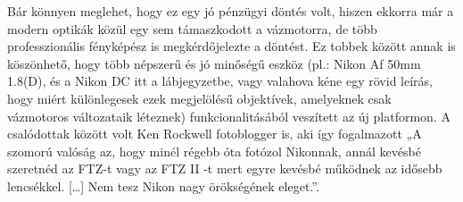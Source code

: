Bár könnyen meglehet, hogy ez egy jó pénzügyi döntés volt, hiszen ekkorra már a modern optikák közül egy sem támaszkodott a vázmotorra, de több professzionális fényképész is megkérdőjelezte a döntést. Ez tobbek között annak is köszönhető, hogy több népszerű és jó minőségű eszköz (pl.: Nikon Af 50mm 1.8(D), és a Nikon DC {itt a lábjegyzetbe, vagy valahova kéne egy rövid leírás, hogy miért különlegesek ezek} megjelölésű objektívek, amelyeknek csak vázmotoros változataik léteznek) funkcionalitásából veszített az új platformon. A csalódottak között volt Ken Rockwell fotoblogger is, aki így fogalmazott „A szomorú valóság az, hogy minél régebb óta fotózol Nikonnak, annál kevésbé szeretnéd az FTZ-t vagy az FTZ II -t mert egyre kevésbé működnek az idősebb lencsékkel. […] Nem tesz Nikon nagy örökségének eleget.”\cite{Nikon_FTZ_Review}.